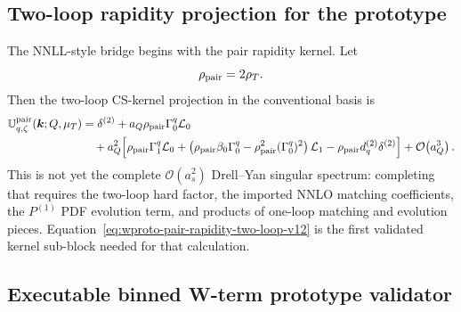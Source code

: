 \documentclass[11pt]{article}
\newcommand{\bk}{\bm{k}}
\newcommand{\deltaT}{\delta^{(2)}}
\newcommand{\order}[1]{\mathcal{O}\!\left(#1\right)}
\begin{document}
\subsection{Two-loop rapidity projection for the prototype}

The NNLL-style bridge begins with the pair rapidity kernel.  Let
\begin{equation}
  \rho_{\rm pair}=2\rho_T .
  \label{eq:wproto-rho-pair-v12}
\end{equation}
Then the two-loop CS-kernel projection in the conventional basis is
\begin{align}
  \mathbb U_{q,\zeta}^{\rm pair}(\bk;Q,\mu_T)
  &=\deltaT
  +a_Q\rho_{\rm pair}\Gamma_0^q\mathcal L_0
  \notag\\
  &\quad
  +a_Q^2\Big[
     \rho_{\rm pair}\Gamma_1^q\mathcal L_0
     +\left(\rho_{\rm pair}\beta_0\Gamma_0^q
       -\rho_{\rm pair}^2(\Gamma_0^q)^2\right)\mathcal L_1
     -\rho_{\rm pair}d_q^{(2)}\deltaT
   \Big]
  +\order{a_Q^3}.
  \label{eq:wproto-pair-rapidity-two-loop-v12}
\end{align}
This is not yet the complete $\order{a_s^2}$ Drell--Yan singular spectrum: completing that
requires the two-loop hard factor, the imported NNLO matching coefficients, the
$P^{(1)}$ PDF evolution term, and products of one-loop matching and evolution pieces.
Equation~\eqref{eq:wproto-pair-rapidity-two-loop-v12} is the first validated kernel
sub-block needed for that calculation.

\subsection{Executable binned W-term prototype validator}
\end{document}
